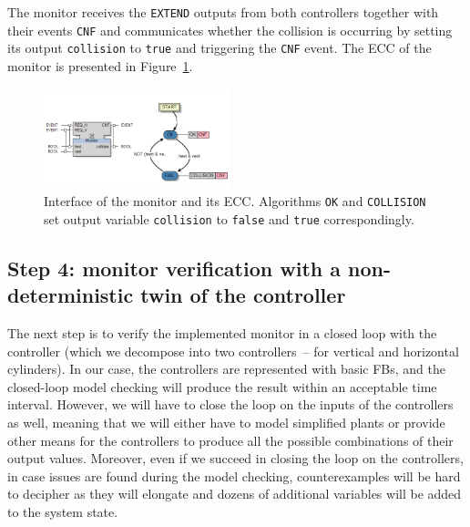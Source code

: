 \begin{bibunit}
The monitor receives the \texttt{EXTEND} outputs from both controllers together with their events \texttt{CNF} and communicates whether the collision is occurring by setting its output \texttt{collision} to \texttt{true} and triggering the \texttt{CNF} event. The ECC of the monitor is presented in Figure~\ref{fig:monitorecc}.



\begin{figure}[h!]
    \centering
    \includegraphics[width=0.48\textwidth]{MX_Papers/Paper3/pic/monitorecc.png}
    \caption{Interface of the monitor and its ECC. Algorithms \texttt{OK} and \texttt{COLLISION} set output variable \texttt{collision} to \texttt{false} and \texttt{true} correspondingly.}
    \label{fig:monitorecc}
\end{figure}

\subsection{Step 4: monitor verification with a non-deterministic twin of the controller }
\label{sec:monitorver}
The next step is to verify the implemented monitor in a closed loop with the controller (which we decompose into two controllers~-- for vertical and horizontal cylinders). In our case, the controllers are represented with basic FBs, and the closed-loop model checking will produce the result within an acceptable time interval. However, we will have to close the loop on the inputs of the controllers as well, meaning that we will either have to model simplified plants or provide other means for the controllers to produce all the possible combinations of their output values. Moreover, even if we succeed in closing the loop on the controllers, in case issues are found during the model checking, counterexamples will be hard to decipher as they will elongate and dozens of additional variables will be added to the system state.


\end{bibunit}
